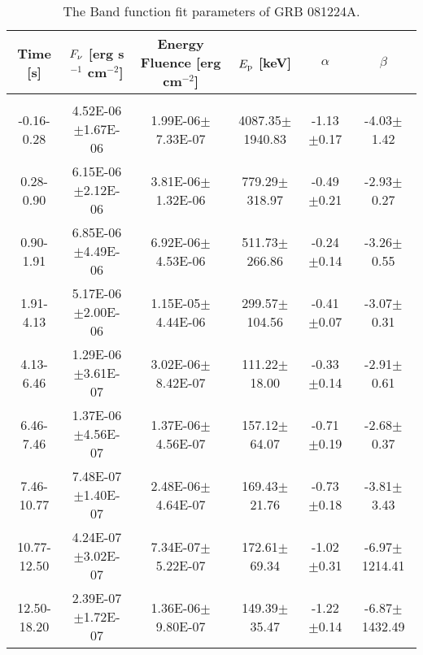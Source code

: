 \begin{table}[h]
\scriptsize
\centering
\label{tab:}
\begin{tabular}{c| c c c c c}
Time [s] & $F_{\nu}$ [erg s$^{-1}$ cm$^{-2}$] & Energy Fluence [erg cm$^{-2}$] & $E_{\rm p}$ [keV] & $\alpha$ & $\beta$ \\
\hline \hline\\ 

-0.16-0.28 & 4.52E-06$\pm$1.67E-06 & 1.99E-06$\pm$7.33E-07 & 4087.35$\pm$1940.83 & -1.13$\pm$0.17 & -4.03$\pm$1.42 \\ 

0.28-0.90 & 6.15E-06$\pm$2.12E-06 & 3.81E-06$\pm$1.32E-06 & 779.29$\pm$318.97 & -0.49$\pm$0.21 & -2.93$\pm$0.27 \\ 

0.90-1.91 & 6.85E-06$\pm$4.49E-06 & 6.92E-06$\pm$4.53E-06 & 511.73$\pm$266.86 & -0.24$\pm$0.14 & -3.26$\pm$0.55 \\ 

1.91-4.13 & 5.17E-06$\pm$2.00E-06 & 1.15E-05$\pm$4.44E-06 & 299.57$\pm$104.56 & -0.41$\pm$0.07 & -3.07$\pm$0.31 \\ 

4.13-6.46 & 1.29E-06$\pm$3.61E-07 & 3.02E-06$\pm$8.42E-07 & 111.22$\pm$18.00 & -0.33$\pm$0.14 & -2.91$\pm$0.61 \\ 

6.46-7.46 & 1.37E-06$\pm$4.56E-07 & 1.37E-06$\pm$4.56E-07 & 157.12$\pm$64.07 & -0.71$\pm$0.19 & -2.68$\pm$0.37 \\ 

7.46-10.77 & 7.48E-07$\pm$1.40E-07 & 2.48E-06$\pm$4.64E-07 & 169.43$\pm$21.76 & -0.73$\pm$0.18 & -3.81$\pm$3.43 \\ 

10.77-12.50 & 4.24E-07$\pm$3.02E-07 & 7.34E-07$\pm$5.22E-07 & 172.61$\pm$69.34 & -1.02$\pm$0.31 & -6.97$\pm$1214.41 \\ 

12.50-18.20 & 2.39E-07$\pm$1.72E-07 & 1.36E-06$\pm$9.80E-07 & 149.39$\pm$35.47 & -1.22$\pm$0.14 & -6.87$\pm$1432.49 \\ 

\end{tabular}
\caption{The Band function fit parameters of GRB 081224A.}
\end{table}

